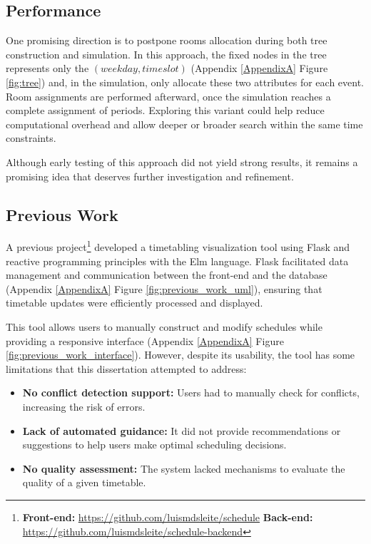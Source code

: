 \subsection{Performance}

One promising direction is to postpone rooms allocation during both tree construction and simulation. In this approach, the fixed nodes in the tree represents only the \((weekday, timeslot)\) (Appendix \ref{AppendixA} Figure \ref{fig:tree}) and, in the simulation, only allocate these two attributes for each event. Room assignments are performed afterward, once the simulation reaches a complete assignment of periods. Exploring this variant could help reduce computational overhead and allow deeper or broader search within the same time constraints.

Although early testing of this approach did not yield strong results, it remains a promising idea that deserves further investigation and refinement.

\subsection{Previous Work}

A previous project\footnote{\textbf{Front-end:} \url{https://github.com/luismdsleite/schedule} \textbf{Back-end:} \url{https://github.com/luismdsleite/schedule-backend}} developed a timetabling visualization tool using Flask and reactive programming principles with the Elm language. Flask facilitated data management and communication between the front-end and the database (Appendix \ref{AppendixA} Figure \ref{fig:previous_work_uml}), ensuring that timetable updates were efficiently processed and displayed. 

This tool allows users to manually construct and modify schedules while providing a responsive interface (Appendix \ref{AppendixA} Figure \ref{fig:previous_work_interface}). However, despite its usability, the tool has some limitations that this dissertation attempted to address:

\begin{itemize}
\item \textbf{No conflict detection support:} Users had to manually check for conflicts, increasing the risk of errors.
\item \textbf{Lack of automated guidance:} It did not provide recommendations or suggestions to help users make optimal scheduling decisions.
\item \textbf{No quality assessment:} The system lacked mechanisms to evaluate the quality of a given timetable.
\end{itemize}

